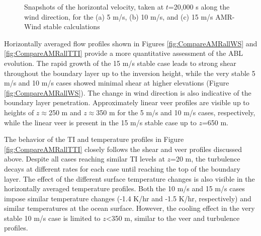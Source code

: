 \begin{figure}[hbt!]
  \centering
  \caption{ \label{fig:SnapshotsSide} Snapshots of the horizontal
    velocity, taken at $t$=20,000 s along the wind direction, for
    the (a) 5 m/s, (b) 10 m/s, and (c) 15 m/s AMR-Wind stable
    calculations }

\end{figure}

Horizontally averaged flow profiles shown in Figures
\ref{fig:CompareAMRallWS} and \ref{fig:CompareAMRallTTI} provide a
more quantitative assessment of the ABL evolution.  The rapid growth
of the 15 m/s stable case leads to strong shear throughout the
boundary layer up to the inversion height, while the very stable 5 m/s
and 10 m/s cases showed minimal shear at higher elevations (Figure \ref{fig:CompareAMRallWS}).  The
change in wind direction is also indicative of the boundary layer
penetration.  Approximately linear veer profiles are visible up to
heights of $z\approx$250 m and $z\approx$350 m for the 5 m/s and 10
m/s cases, respectively, while the linear veer is present in the 15
m/s stable case up to $z$=650 m.

The behavior of the TI and temperature profiles in Figure
\ref{fig:CompareAMRallTTI} closely follows the shear and veer profiles
discussed above.  Despite all cases reaching similar TI levels at
$z$=20 m, the turbulence decays at different rates for each case until
reaching the top of the boundary layer.  The effect of the different
surface temperature changes is also visible in the horizontally
averaged temperature profiles.  Both the 10 m/s and 15 m/s cases impose
similar temperature changes (-1.4 K/hr and -1.5 K/hr, respectively)
and similar temperatures at the ocean surface.  However, the
cooling effect in the very stable 10 m/s case is limited to $z$<350
m, similar to the veer and turbulence profiles.

